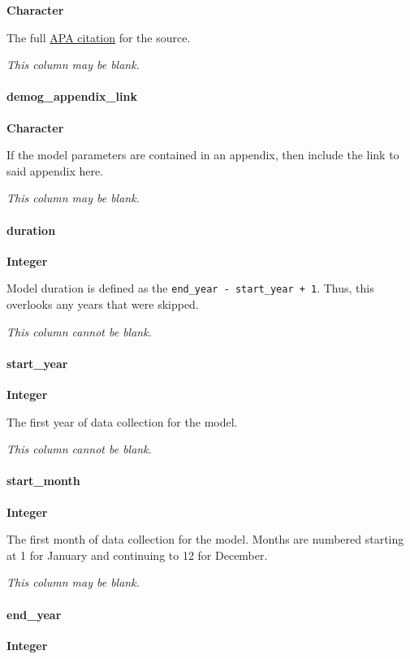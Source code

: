 \documentclass[]{article}
\let\oldparagraph\paragraph
\renewcommand{\paragraph}[1]{\oldparagraph{#1}\mbox{}}
\begin{document}
\textbf{Character}

The full \href{http://www.bibme.org/apa}{APA citation} for the source.

\emph{This column may be blank.}

\paragraph{demog\_appendix\_link}\label{demog_appendix_link}

\textbf{Character}

If the model parameters are contained in an appendix, then include the
link to said appendix here.

\emph{This column may be blank.}

\paragraph{duration}\label{duration}

\textbf{Integer}

Model duration is defined as the
\texttt{end\_year\ -\ start\_year\ +\ 1}. Thus, this overlooks any years
that were skipped.

\emph{This column cannot be blank.}

\paragraph{start\_year}\label{start_year}

\textbf{Integer}

The first year of data collection for the model.

\emph{This column cannot be blank.}

\paragraph{start\_month}\label{start_month}

\textbf{Integer}

The first month of data collection for the model. Months are numbered
starting at 1 for January and continuing to 12 for December.

\emph{This column may be blank.}

\paragraph{end\_year}\label{end_year}

\textbf{Integer}
\end{document}
